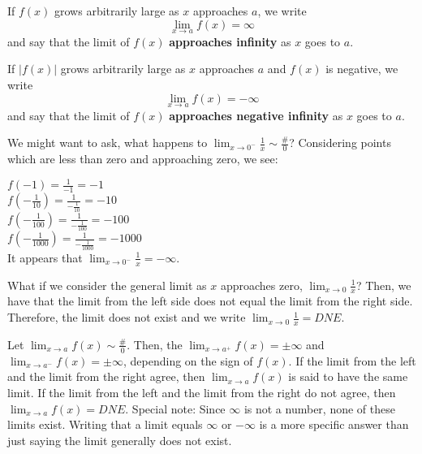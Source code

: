 \documentclass{ximera}
\begin{document}
\begin{definition}\label{def:inflimit}
If $f(x)$ grows arbitrarily large as $x$ approaches $a$, we write
\[
\lim_{x\to a} f(x) = \infty
\]
and say that the limit of $f(x)$ \textbf{approaches infinity} as $x$
goes to $a$.

If $|f(x)|$ grows arbitrarily large as $x$ approaches $a$ and $f(x)$ is
negative, we write
\[
\lim_{x\to a} f(x) = -\infty
\]
and say that the limit of $f(x)$ \textbf{approaches negative infinity}
as $x$ goes to $a$.
\end{definition}

We might want to ask, what happens to $\lim_{x\to 0^-} \frac{1}{x}  \sim \frac{\#}{0}$?  Considering points which are less than zero and approaching zero, we see:

$f(-1) = \frac{1}{-1}=-1$\\ \vspace{.1in}
$f\left(-\frac{1}{10}\right) = \frac{1}{-\frac{1}{10}}=-10$\\ \vspace{.1in}
$f\left(-\frac{1}{100}\right) = \frac{1}{-\frac{1}{100}}=-100$\\ \vspace{.1in}
$f\left(-\frac{1}{1000}\right) = \frac{1}{-\frac{1}{1000}}=-1000$\\ 

It appears that $\lim_{x\to 0^-} \frac{1}{x} = -\infty$.  

What if we consider the general limit as $x$ approaches zero, $\lim_{x\to 0} \frac{1}{x}$?  Then, we have that the limit from the left side does not equal the limit from the right side.  Therefore, the limit does not exist and we write $\lim_{x\to 0} \frac{1}{x} = DNE$.

\begin{theorem}
Let $\lim_{x\to a} f(x) \sim \frac{\#}{0}$.  Then, the $\lim_{x\to a^+} f(x) = \pm \infty$ and $\lim_{x\to a^-} f(x) = \pm \infty$, depending on the sign of $f(x)$.  If the limit from the left and the limit from the right agree, then $\lim_{x\to a} f(x)$ is said to have the same limit.  If the limit from the left and the limit from the right do not agree, then $\lim_{x\to a} f(x) = DNE$.  Special note: Since $\infty$ is not a number, none of these limits exist.  Writing that a limit equals $\infty$ or $-\infty$ is a more specific answer than just saying the limit generally does not exist.
\end{theorem}
\end{document}
